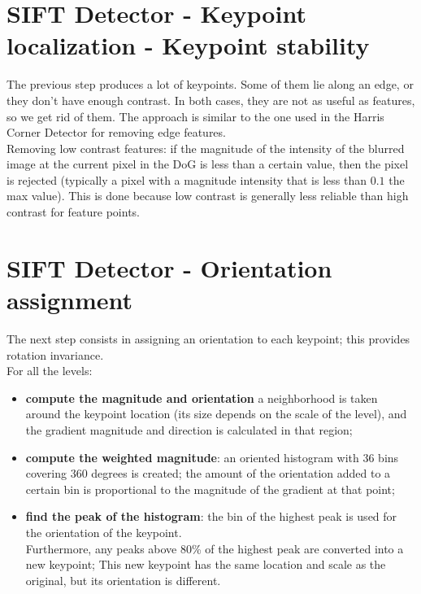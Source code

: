 \documentclass{article}
\begin{document}
\section*{SIFT Detector - Keypoint localization - Keypoint stability}

The previous step produces a lot of keypoints. Some of them lie along an edge, or they don’t have enough contrast. In both cases, they are not as useful as features, so we get rid of them. The approach is similar to the one used in the Harris Corner Detector for removing edge features. \\

Removing low contrast features: if the magnitude of the intensity of the blurred image at the current pixel in the DoG is less than a certain value, then the pixel is rejected (typically a pixel with a magnitude intensity that is less than $0.1$ the max value). This is done because low contrast is generally less reliable than high contrast for feature points. 

\newpage

\section*{SIFT Detector - Orientation assignment}

The next step consists in assigning an orientation to each keypoint; this provides rotation invariance. \\

For all the levels:
\begin{itemize}
    \item \textbf{compute the magnitude and orientation} a neighborhood is taken around the keypoint location (its size depends on the scale of the level), and the gradient magnitude and direction is calculated in that region;
    \item \textbf{compute the weighted magnitude}: an oriented histogram with $36$ bins covering $360$ degrees is created; the amount of the orientation added to a certain bin is proportional to the magnitude of the gradient at that point;
    \item \textbf{find the peak of the histogram}: the bin of the highest peak is used for the orientation of the keypoint. \\
    
    Furthermore, any peaks above 80\% of the highest peak are converted into a new keypoint; This new keypoint has the same location and scale as the original, but its orientation is different.
\end{itemize}
\end{document}
